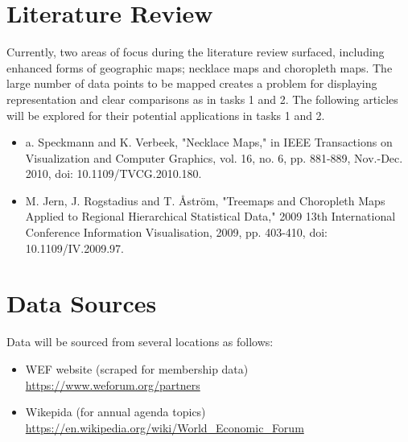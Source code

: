 \documentclass[journal]{vgtc}                %
\begin{document}

\section{Literature Review}

Currently, two areas of focus during the literature review surfaced, including enhanced forms of geographic maps; necklace maps and choropleth maps. The large number of data points to be mapped creates a problem for displaying representation and clear comparisons as in tasks 1 and 2. The following articles will be explored for their potential applications in tasks 1 and 2.

\begin{itemize}
    \item a. Speckmann and K. Verbeek, "Necklace Maps," in IEEE Transactions on Visualization and Computer Graphics, vol. 16, no. 6, pp. 881-889, Nov.-Dec. 2010, doi: 10.1109/TVCG.2010.180.
    \item M. Jern, J. Rogstadius and T. Åström, "Treemaps and Choropleth Maps Applied to Regional Hierarchical Statistical Data," 2009 13th International Conference Information Visualisation, 2009, pp. 403-410, doi: 10.1109/IV.2009.97.
\end{itemize}
\section{Data Sources}

Data will be sourced from several locations as follows:

\begin{itemize}
    \item WEF website (scraped for membership data) \url{https://www.weforum.org/partners}
    \item Wikepida (for annual agenda topics) \url{https://en.wikipedia.org/wiki/World_Economic_Forum}
\end{itemize}
\end{document}
